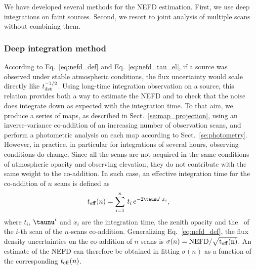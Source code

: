 We have developed several methods for the NEFD estimation. First,
we use deep integrations on faint sources. Second, we resort to joint
analysis of multiple scans without combining them.

\subsubsection{Deep integration method}
According to Eq.~\ref{eq:nefd_def} and Eq.~\ref{eq:nefd_tau_el}, if a
source was observed under stable atmospheric conditions, the flux
uncertainty would scale directly like
$t_{\rm{det}}^{-1/2}$. Using long-time integration observation on a
source, this relation provides both a way to estimate the NEFD and to
check that the noise does integrate down as expected with the integration
time. To that aim, we produce a series of maps, as described in Sect.~\ref{se:map_projection},
using an inverse-variance co-addition of an increasing number of observation
scans, and perform a photometric analysis on each map according to
Sect.~\ref{se:photometry}. However, in practice, in particular for
integrations of several hours, observing conditions do change.
Since all the scans are not acquired in the same conditions of
atmospheric opacity and observing elevation, they
do not contribute with the same weight to the co-addition. In such
case, an effective integration time for the co-addition of $n$ scans
is defined as
%
\begin{equation}
t_{\rm{eff}}(n) = \sum_{i=1}^{n}\, t_i\,  e^{-2\taunu^i\, x_i},
\label{eq:sigma_tau_w8}
\end{equation}
%
where $t_i$, $\taunu^i$ and $x_i$ are the integration time, the zenith
opacity and the \airmass\ of the $i$-th scan of the $n$-scans
co-addition.
Generalizing Eq.~\ref{eq:nefd_def}, the flux density uncertainties on
the co-addition of $n$ scans is $\sigma(n) = \rm{NEFD}/\sqrt{t_{\rm{eff}}(n)}$.
An estimate of the
NEFD can therefore be obtained in fitting
$\sigma(n)$ as a function of the corresponding $t_{\rm{eff}}(n)$.
%
%
%

